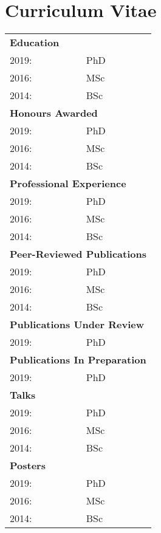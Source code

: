 \chapter*{Curriculum Vitae}
\begin{table}[ht]
\begin{tabular}{ll}
\multicolumn{2}{l}{\textbf{Education}}\\
2019: &PhD\\
2016: &MSc\\
2014: &BSc\\
\multicolumn{2}{l}{\textbf{Honours Awarded}}\\
2019: &PhD\\
2016: &MSc\\
2014: &BSc\\
\multicolumn{2}{l}{\textbf{Professional Experience}}\\
2019: &PhD\\
2016: &MSc\\
2014: &BSc\\
\multicolumn{2}{l}{\textbf{Peer-Reviewed Publications}}\\
2019: &PhD\\
2016: &MSc\\
2014: &BSc\\
\multicolumn{2}{l}{\textbf{Publications Under Review}}\\
2019: &PhD\\
\multicolumn{2}{l}{\textbf{Publications In Preparation}}\\
2019: &PhD\\
\multicolumn{2}{l}{\textbf{Talks}}\\
2019: &PhD\\
2016: &MSc\\
2014: &BSc\\
\multicolumn{2}{l}{\textbf{Posters}}\\
2019: &PhD\\
2016: &MSc\\
2014: &BSc\\
\end{tabular}
\end{table}